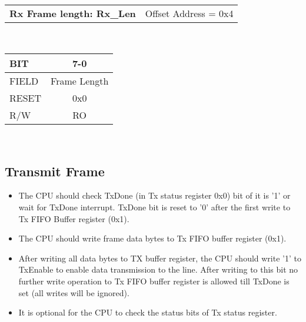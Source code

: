 \documentclass[a4paper,11pt]{article}
\begin{document}
\begin{tabular}{l l}
\textbf{Rx Frame length: Rx\_Len} & Offset Address = 0x4\\
\end{tabular}\\
 
\begin{tabular}{|l||c|}
\hline
\hline
BIT   & 7-0\\ 
\hline
FIELD & Frame Length\\
\hline
RESET & 0x0\\
\hline
R/W   & RO\\
\hline
\end{tabular}\\
 
\subsection{Transmit Frame}
\begin{itemize}
\item The CPU should check TxDone (in Tx status register 0x0) bit of it is '1' or wait for TxDone interrupt. TxDone bit is reset to '0' after the first write to Tx FIFO Buffer register (0x1). 
\item The CPU should write frame data bytes to Tx FIFO buffer register (0x1).
\item After writing all data bytes to TX buffer register, the CPU should write '1' to TxEnable to enable data transmission to the line. After writing to this bit no further write operation to Tx FIFO buffer register is allowed till TxDone is set (all writes will be ignored).
\item It is optional for the CPU to check the status bits of Tx status register.
\end{itemize}
 
\end{document}
